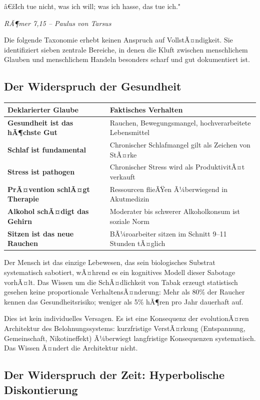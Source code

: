 ﻿\documentclass[12pt, a4paper]{article}
\begin{document}
\epigraph{â€žIch tue nicht, was ich will; was ich hasse, das tue ich."}%
{\textit{RÃ¶mer 7,15 -- Paulus von Tarsus}}

Die folgende Taxonomie erhebt keinen Anspruch auf VollstÃ¤ndigkeit. Sie
identifiziert sieben zentrale Bereiche, in denen die Kluft zwischen menschlichem
Glauben und menschlichem Handeln besonders scharf und gut dokumentiert ist.

\subsection{Der Widerspruch der Gesundheit}

\medskip
\begin{tabular}{>{\bfseries}p{5cm} p{8cm}}
\toprule
Deklarierter Glaube & Faktisches Verhalten \\
\midrule
Gesundheit ist das hÃ¶chste Gut & Rauchen, Bewegungsmangel, hochverarbeitete Lebensmittel \\
Schlaf ist fundamental & Chronischer Schlafmangel gilt als Zeichen von StÃ¤rke \\
Stress ist pathogen & Chronischer Stress wird als ProduktivitÃ¤t verkauft \\
PrÃ¤vention schlÃ¤gt Therapie & Ressourcen flieÃŸen Ã¼berwiegend in Akutmedizin \\
Alkohol schÃ¤digt das Gehirn & Moderater bis schwerer Alkoholkonsum ist soziale Norm \\
Sitzen ist das neue Rauchen & BÃ¼roarbeiter sitzen im Schnitt 9--11 Stunden tÃ¤glich \\
\bottomrule
\end{tabular}
\medskip

Der Mensch ist das einzige Lebewesen, das sein biologisches Substrat systematisch
sabotiert, wÃ¤hrend es ein kognitives Modell dieser Sabotage vorhÃ¤lt. Das Wissen
um die SchÃ¤dlichkeit von Tabak erzeugt statistisch gesehen keine proportionale
VerhaltensÃ¤nderung: Mehr als 80\% der Raucher kennen das Gesundheitsrisiko;
weniger als 5\% hÃ¶ren pro Jahr dauerhaft auf.

Dies ist kein individuelles Versagen. Es ist eine Konsequenz der evolutionÃ¤ren
Architektur des Belohnungssystems: kurzfristige VerstÃ¤rkung (Entspannung,
Gemeinschaft, Nikotineffekt) Ã¼berwiegt langfristige Konsequenzen systematisch.
Das Wissen Ã¤ndert die Architektur nicht.

\subsection{Der Widerspruch der Zeit: Hyperbolische Diskontierung}
\end{document}
